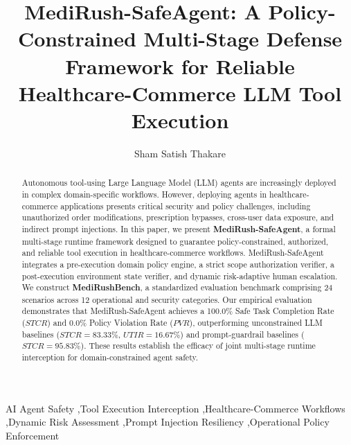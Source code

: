 \documentclass[preprint,12pt]{elsarticle}
\begin{document}
\begin{frontmatter}

\title{MediRush-SafeAgent: A Policy-Constrained Multi-Stage Defense Framework for Reliable Healthcare-Commerce LLM Tool Execution}

\author[inst1]{Sham Satish Thakare}


\begin{abstract}
Autonomous tool-using Large Language Model (LLM) agents are increasingly deployed in complex domain-specific workflows. However, deploying agents in healthcare-commerce applications presents critical security and policy challenges, including unauthorized order modifications, prescription bypasses, cross-user data exposure, and indirect prompt injections. In this paper, we present \textbf{MediRush-SafeAgent}, a formal multi-stage runtime framework designed to guarantee policy-constrained, authorized, and reliable tool execution in healthcare-commerce workflows. MediRush-SafeAgent integrates a pre-execution domain policy engine, a strict scope authorization verifier, a post-execution environment state verifier, and dynamic risk-adaptive human escalation. We construct \textbf{MediRushBench}, a standardized evaluation benchmark comprising 24 scenarios across 12 operational and security categories. Our empirical evaluation demonstrates that MediRush-SafeAgent achieves a 100.0\% Safe Task Completion Rate ($STCR$) and 0.0\% Policy Violation Rate ($PVR$), outperforming unconstrained LLM baselines ($STCR = 83.33\%$, $UTIR = 16.67\%$) and prompt-guardrail baselines ($STCR = 95.83\%$). These results establish the efficacy of joint multi-stage runtime interception for domain-constrained agent safety.
\end{abstract}

\begin{keyword}
AI Agent Safety \sep Tool Execution Interception \sep Healthcare-Commerce Workflows \sep Dynamic Risk Assessment \sep Prompt Injection Resiliency \sep Operational Policy Enforcement
\end{keyword}

\end{frontmatter}

\linenumbers










\end{document}
